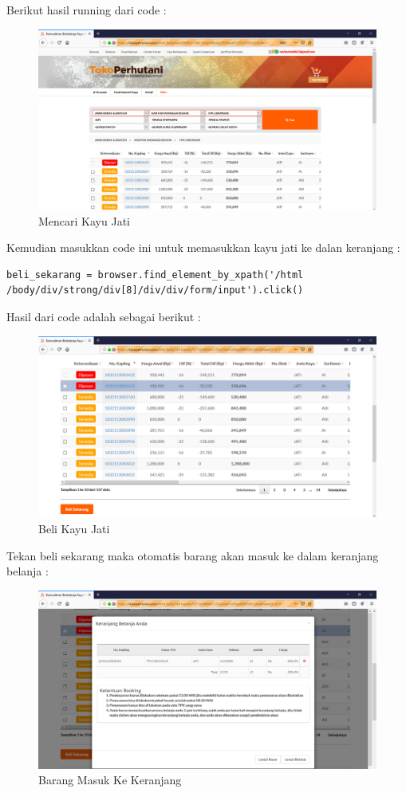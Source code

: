 Berikut hasil running dari code :
\begin{figure}[h]
	\centering
	\includegraphics[scale=0.25]{figures/jatii}
	\caption{Mencari Kayu Jati}
\end{figure}

Kemudian masukkan code ini untuk memasukkan kayu jati ke dalan keranjang :
\begin{verbatim}
beli_sekarang = browser.find_element_by_xpath('/html
/body/div/strong/div[8]/div/div/form/input').click()
\end{verbatim}
Hasil dari code adalah sebagai berikut :
\begin{figure}[h]
	\centering
	\includegraphics[scale=0.25]{figures/belii}
	\caption{Beli Kayu Jati}
\end{figure}

\newpage
Tekan beli sekarang maka otomatis barang akan masuk ke dalam keranjang belanja :
\begin{figure}[h]
	\centering
	\includegraphics[scale=0.20]{figures/keranjangg}
	\caption{Barang Masuk Ke Keranjang}
\end{figure}


